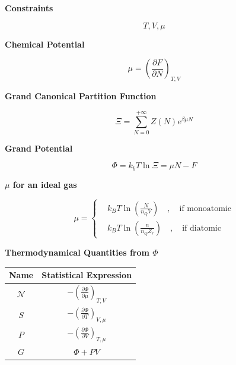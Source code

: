 \documentclass{article}
\begin{document}
\newpage
\begin{tcolorbox}[colframe=gray!90, colback=gray!5, coltitle=white, sharp corners, title=\textbf{Grand Canonical Ensamble, Summary}, fonttitle=\large\bfseries]

    \textbf{Constraints}

    \begin{equation}
        T, V, \mu
    \end{equation}

    \textbf{Chemical Potential}

    \begin{equation}
        \mu = \left( \frac{\partial F}{\partial N} \right)_{T,V}
    \end{equation}

    \textbf{Grand Canonical Partition Function}

    \begin{equation}
        \Xi = \sum_{N=0}^{+\infty} Z(N)e^{\beta\mu N}
    \end{equation}

    \textbf{Grand Potential}

    \begin{equation}
        \Phi = k_bT\ln{\Xi} = \mu N - F
    \end{equation}

    \textbf{\(\mu \) for an ideal gas}

    \begin{equation}
        \mu=
        \left\{
        \begin{aligned}
             & k_BT\ln{\left( \frac{N}{n_QV} \right)} \quad , \quad \text{if monoatomic}  \\
             & k_BT\ln{\left( \frac{n}{n_Q Z_r} \right)} \quad , \quad \text{if diatomic}
        \end{aligned}
        \right.
    \end{equation}

    \vspace{0.3cm}
    \textbf{Thermodynamical Quantities from \(\Phi \)}

    \begin{center}
        \begin{tabular}{|c|c|}
            \hline
            \textbf{Name}     & \textbf{Statistical Expression}                                \\ \hline
            \( \mathcal{N} \) & \( -\left( \frac{\partial \Phi}{\partial \mu} \right)_{T,V} \) \\ \hline
            \( S \)           & \( -\left( \frac{\partial \Phi}{\partial T} \right)_{V,\mu} \) \\ \hline
            \( P \)           & \( -\left( \frac{\partial \Phi}{\partial V} \right)_{T,\mu} \) \\ \hline
            \( G \)           & \( \Phi + PV \)                                                \\ \hline
        \end{tabular}
    \end{center}

\end{tcolorbox}
\end{document}
